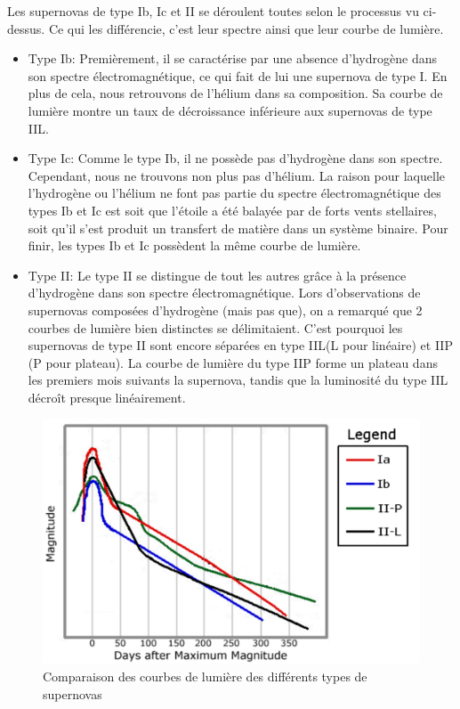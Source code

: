 Les supernovas de type Ib, Ic et II se déroulent toutes selon le processus vu ci-dessus. Ce qui les différencie, c'est leur spectre ainsi que leur courbe de lumière.\bigskip

\begin{itemize}
	
	\item Type Ib: Premièrement, il se caractérise par une absence d'hydrogène dans son spectre électromagnétique, ce qui fait de lui une supernova de type I. En plus de cela, nous retrouvons de l'hélium dans sa composition. Sa courbe de lumière montre un taux de décroissance inférieure aux supernovas de type IIL.
	
	\item Type Ic: Comme le type Ib, il ne possède pas d'hydrogène dans son spectre. Cependant, nous ne trouvons non plus pas d'hélium. La raison pour laquelle l'hydrogène ou l'hélium ne font pas partie du spectre électromagnétique des types Ib et Ic est soit que l'étoile a été balayée par de forts vents stellaires, soit qu'il s'est produit un transfert de matière dans un système binaire. Pour finir, les types Ib et Ic possèdent la même courbe de lumière.
	
	\item Type II: Le type II se distingue de tout les autres grâce à la présence d'hydrogène dans son spectre électromagnétique. Lors d'observations de supernovas composées d'hydrogène (mais pas que), on a remarqué que 2 courbes de lumière bien distinctes se délimitaient. C'est pourquoi les supernovas de type II sont encore séparées en type IIL(L pour linéaire) et IIP (P pour plateau). La courbe de lumière du type IIP forme un plateau dans les premiers mois suivants la supernova, tandis que la luminosité du type IIL décroît presque linéairement.
	
\end{itemize}\newpage


\begin{figure}[H]\vspace{1cm}
	\centering
	\includegraphics[scale=0.4]{images/lightcurves}
	\caption{Comparaison des courbes de lumière des différents types de supernovas}
\end{figure}\bigskip 

